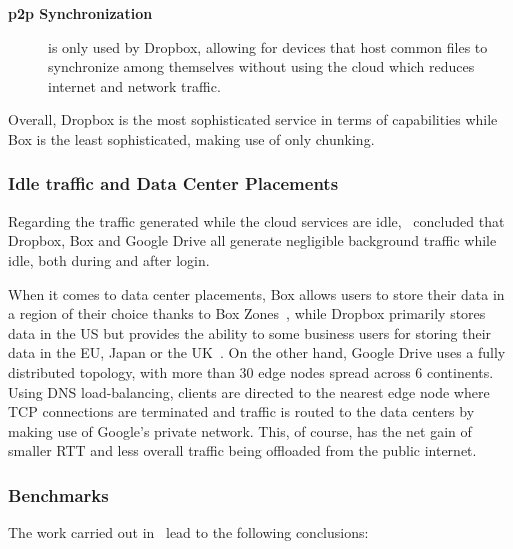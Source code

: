 \begin{description}
    \item[\textbf{\ac{p2p} Synchronization}] is only used by Dropbox, allowing for devices that host common files to synchronize among themselves without using the cloud which reduces internet and network traffic.
\end{description}

Overall, Dropbox is the most sophisticated service in terms of capabilities while Box is the least sophisticated, making use of only chunking.

\subsubsection{Idle traffic and Data Center Placements}
Regarding the traffic generated while the cloud services are idle,~\cite{personal1} concluded that Dropbox, Box and Google Drive all generate negligible background traffic while idle, both during and after login.

When it comes to data center placements, Box allows users to store their data in a region of their choice thanks to Box Zones~\cite{box}, while Dropbox primarily stores data in the US but provides the ability to some business users for storing their data in the EU, Japan or the UK~\cite{dropbox_data_centers}. On the other hand, Google Drive uses a fully distributed topology, with more than 30 edge nodes spread across 6 continents. Using DNS load-balancing, clients are directed to the nearest edge node where TCP connections are terminated and traffic is routed to the data centers by making use of Google's private network. This, of course, has the net gain of smaller RTT and less overall traffic being offloaded from the public internet.

\subsubsection{Benchmarks}

The work carried out in~\cite{personal1} lead to the following conclusions:

